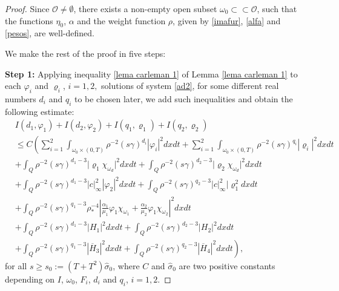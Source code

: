 \documentclass[11pt,a4paper]{amsart}
\numberwithin{equation}{section}
\begin{document}
\begin{proof}
Since $\mathcal{O}\neq \emptyset$, there exists a non-empty open subset $\omega_0 \subset \subset \mathcal{O}$, such that the functions $\eta_0$, $\alpha$ and the  weight function $\rho$, given by  \eqref{imafur},  \eqref{alfa} and  \eqref{pesos}, are well-defined. 

We make the rest of the proof in five steps:

\textbf{Step 1:} Applying inequality \eqref{lema carleman 1} of Lemma \eqref{lema carleman 1} to each $\varphi_i$ and $\varrho_i$, $i=1,2,$ solutions of system \eqref{ad2}, for some different real numbers $d_i$ and $q_i$ to be chosen later, we add such inequalities and obtain the following  estimate:
\begin{equation}\label{pre carleman}
\begin{split}
  &I(d_1,\varphi_1) +I(d_2,\varphi_2)+I(q_1,\varrho_1)+I(q_2,\varrho_2)\\
    &\leq C\left( \sum_{i=1}^2 \int_{\omega_0 \times (0,T)} \rho^{-2}(s\gamma)^{d_i}|\varphi_i|^2 dxdt +\sum_{i=1}^2 \int_{\omega_0 \times (0,T)} \rho^{-2}(s\gamma)^{q_i}|\varrho_i|^2 dxdt \right.\\
   & +\int_Q\rho^{-2}(s\gamma)^{d_1-3}\vert \varrho_1\chi_{\omega_{d}} \vert^2 dxdt+\int_Q\rho^{-2}(s\gamma)^{d_2-3}\vert \varrho_2\chi_{\omega_{d}} \vert^2 dxdt \\
    & +\int_Q\rho^{-2}(s\gamma)^{d_1-3} |c|^2_\infty |\varphi_2|^2dxdt + \int_Q\rho^{-2}(s\gamma)^{q_2-3} |c|^2_\infty |\varrho_1^2dxdt \\
  &+\int_Q\rho^{-2}(s\gamma)^{q_1-3} \rho_*^{-4}\left|\frac{\alpha_1}{\mu_1}\varphi_1\chi_{\omega_1}+ \frac{\alpha_2}{\mu_2}\varphi_1\chi_{\omega_2}\right|^2  dxdt \\
  &+\int_Q\rho^{-2}(s\gamma)^{d_1-3} \vert H_1\vert^2  dxdt +\int_Q\rho^{-2}(s\gamma)^{d_2-3} \vert H_2\vert^2  dxdt \\
  &\left. +\int_Q\rho^{-2}(s\gamma)^{q_1-3} |\overline{H}_3|^2  dxdt +\int_Q\rho^{-2}(s\gamma)^{q_2-3} |\overline{H}_4|^2  dxdt \right),   
\end{split}
\end{equation} for all  $s\geq s_0 := (T+T^2)\hat{\sigma}_{0}$, where $C$ and $\hat{\sigma}_{0}$ are two positive constants depending on  $I$, $\omega_0$, $F_i$, $d_i$ and  $q_i$, $i=1,2$. 


\end{proof}
\end{document}
